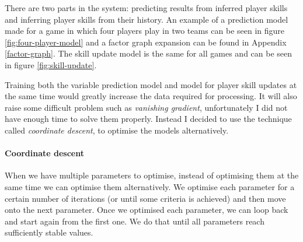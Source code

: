 \documentclass[12pt,a4paper]{book}
\begin{document}
There are two parts in the system: predicting results from inferred player skills and inferring player skills from their history.
An example of a prediction model made for a game in which four players play in two teams can be seen in figure \ref{fig:four-player-model} and a factor graph expansion can be found in Appendix \ref{factor-graph}.
The skill update model is the same for all games and can be seen in figure \ref{fig:skill-update}.

Training both the variable prediction model and model for player skill updates at the same time would greatly increase the data required for processing. %
It will also raise some difficult problem such as \emph{vanishing gradient}, unfortunately I did not have enough time to solve them properly.
Instead I decided to use the technique called \emph{coordinate descent}, to optimise the models alternatively.
\paragraph{Coordinate descent}
When we have multiple parameters to optimise, instead of optimising them at the same time we can optimise them alternatively.
We optimise each parameter for a certain number of iterations (or until some criteria is achieved) and then move onto the next parameter.
Once we optimised each parameter, we can loop back and start again from the first one.
We do that until all parameters reach sufficiently stable values.
\end{document}
